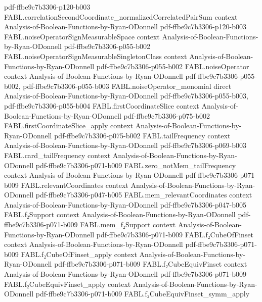 \begin{theorem}
  {pdf-ffbe9c7b3306-p120-b003}
\proofstep
  {FABL.correlationSecondCoordinate_normalizedCorrelatedPairSum}
  {context}
  {Analysis-of-Boolean-Functions-by-Ryan-ODonnell}
  {pdf-ffbe9c7b3306-p120-b003}
\proofstep
  {FABL.noiseOperatorSignMeasurableSpace}
  {context}
  {Analysis-of-Boolean-Functions-by-Ryan-ODonnell}
  {pdf-ffbe9c7b3306-p055-b002}
\proofstep
  {FABL.noiseOperatorSignMeasurableSingletonClass}
  {context}
  {Analysis-of-Boolean-Functions-by-Ryan-ODonnell}
  {pdf-ffbe9c7b3306-p055-b002}
\proofstep
  {FABL.noiseOperator}
  {context}
  {Analysis-of-Boolean-Functions-by-Ryan-ODonnell}
  {pdf-ffbe9c7b3306-p055-b002,
    pdf-ffbe9c7b3306-p055-b003}
\proofstep
  {FABL.noiseOperator_monomial}
  {direct}
  {Analysis-of-Boolean-Functions-by-Ryan-ODonnell}
  {pdf-ffbe9c7b3306-p055-b003,
    pdf-ffbe9c7b3306-p055-b004}
\proofstep
  {FABL.firstCoordinateSlice}
  {context}
  {Analysis-of-Boolean-Functions-by-Ryan-ODonnell}
  {pdf-ffbe9c7b3306-p075-b002}
\proofstep
  {FABL.firstCoordinateSlice_apply}
  {context}
  {Analysis-of-Boolean-Functions-by-Ryan-ODonnell}
  {pdf-ffbe9c7b3306-p075-b002}
\proofstep
  {FABL.tailFrequency}
  {context}
  {Analysis-of-Boolean-Functions-by-Ryan-ODonnell}
  {pdf-ffbe9c7b3306-p069-b003}
\proofstep
  {FABL.card_tailFrequency}
  {context}
  {Analysis-of-Boolean-Functions-by-Ryan-ODonnell}
  {pdf-ffbe9c7b3306-p071-b009}
\proofstep
  {FABL.zero_notMem_tailFrequency}
  {context}
  {Analysis-of-Boolean-Functions-by-Ryan-ODonnell}
  {pdf-ffbe9c7b3306-p071-b009}
\proofstep
  {FABL.relevantCoordinates}
  {context}
  {Analysis-of-Boolean-Functions-by-Ryan-ODonnell}
  {pdf-ffbe9c7b3306-p047-b005}
\proofstep
  {FABL.mem_relevantCoordinates}
  {context}
  {Analysis-of-Boolean-Functions-by-Ryan-ODonnell}
  {pdf-ffbe9c7b3306-p047-b005}
\proofstep
  {FABL.f₂Support}
  {context}
  {Analysis-of-Boolean-Functions-by-Ryan-ODonnell}
  {pdf-ffbe9c7b3306-p071-b009}
\proofstep
  {FABL.mem_f₂Support}
  {context}
  {Analysis-of-Boolean-Functions-by-Ryan-ODonnell}
  {pdf-ffbe9c7b3306-p071-b009}
\proofstep
  {FABL.f₂CubeOfFinset}
  {context}
  {Analysis-of-Boolean-Functions-by-Ryan-ODonnell}
  {pdf-ffbe9c7b3306-p071-b009}
\proofstep
  {FABL.f₂CubeOfFinset_apply}
  {context}
  {Analysis-of-Boolean-Functions-by-Ryan-ODonnell}
  {pdf-ffbe9c7b3306-p071-b009}
\proofstep
  {FABL.f₂CubeEquivFinset}
  {context}
  {Analysis-of-Boolean-Functions-by-Ryan-ODonnell}
  {pdf-ffbe9c7b3306-p071-b009}
\proofstep
  {FABL.f₂CubeEquivFinset_apply}
  {context}
  {Analysis-of-Boolean-Functions-by-Ryan-ODonnell}
  {pdf-ffbe9c7b3306-p071-b009}
\proofstep
  {FABL.f₂CubeEquivFinset_symm_apply}

\end{theorem}
